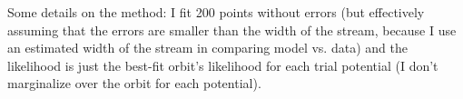 Some details on the method: I fit 200 points without errors (but effectively assuming that the errors are smaller than the width of the stream, because I use an estimated width of the stream in comparing model vs. data) and the likelihood is just the best-fit orbit's likelihood for each trial potential (I don't marginalize over the orbit for each potential).
